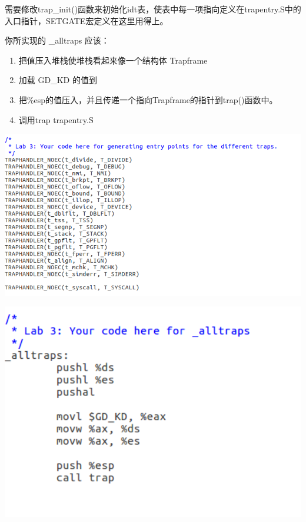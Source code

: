 \begin{ExerciseList}

需要修改trap\_init()函数来初始化idt表，使表中每一项指向定义在trapentry.S中的入口指针，SETGATE宏定义在这里用得上。

你所实现的 \_alltraps 应该：

\begin{enumerate}
\item 把值压入堆栈使堆栈看起来像一个结构体 Trapframe
\item 加载 GD\_KD 的值到 %
\item 把\%esp的值压入，并且传递一个指向Trapframe的指针到trap()函数中。
\item 调用trap trapentry.S
\end{enumerate}

\includegraphics[width=6in]{figures/lab2/image62.png}

\includegraphics[width=6in]{figures/lab2/image61.png}


\end{ExerciseList}
